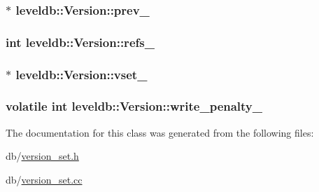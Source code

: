 \subsubsection[{prev\+\_\+}]{$\ast$ leveldb\+::\+Version\+::prev\+\_\+\hspace{0.3cm}{\ttfamily [private]}}\label{classleveldb_1_1_version_a78f5343161662289e86f9d53c5995833}
\hypertarget{classleveldb_1_1_version_aa59ecbf976d0d28966892c93c8d8c634}{}
\subsubsection[{refs\+\_\+}]{\setlength{\rightskip}{0pt plus 5cm}int leveldb\+::\+Version\+::refs\+\_\+\hspace{0.3cm}{\ttfamily [private]}}\label{classleveldb_1_1_version_aa59ecbf976d0d28966892c93c8d8c634}
\hypertarget{classleveldb_1_1_version_ab27cb3e1215e4b948fbee011203098b4}{}
\subsubsection[{vset\+\_\+}]{$\ast$ leveldb\+::\+Version\+::vset\+\_\+\hspace{0.3cm}{\ttfamily [private]}}\label{classleveldb_1_1_version_ab27cb3e1215e4b948fbee011203098b4}
\hypertarget{classleveldb_1_1_version_a3d2d9dc7399ae6808cb4986cdb0024fb}{}
\subsubsection[{write\+\_\+penalty\+\_\+}]{\setlength{\rightskip}{0pt plus 5cm}volatile int leveldb\+::\+Version\+::write\+\_\+penalty\+\_\+\hspace{0.3cm}{\ttfamily [private]}}\label{classleveldb_1_1_version_a3d2d9dc7399ae6808cb4986cdb0024fb}


The documentation for this class was generated from the following files\+:\begin{DoxyCompactItemize}
\item 
db/\hyperlink{version__set_8h}{version\+\_\+set.\+h}\item 
db/\hyperlink{version__set_8cc}{version\+\_\+set.\+cc}\end{DoxyCompactItemize}
